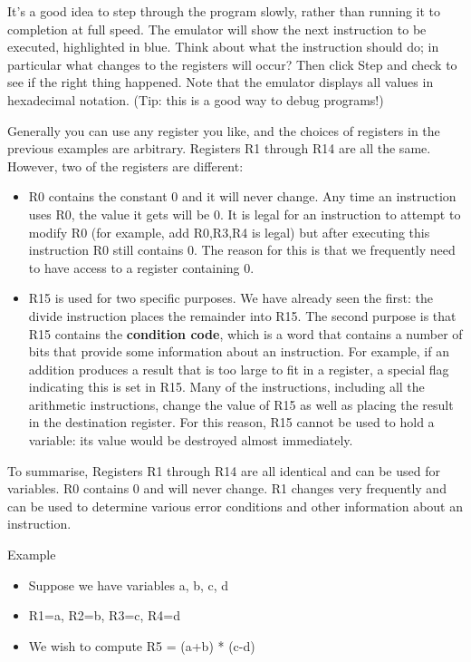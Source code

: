 \documentclass[11pt]{article}
\begin{document}
\begin{itemize}
It's a good idea to step through the program slowly, rather than
running it to completion at full speed.  The emulator will show the
next instruction to be executed, highlighted in blue.  Think about
what the instruction should do; in particular what changes to the
registers will occur?  Then click Step and check to see if the right
thing happened.  Note that the emulator displays all values in
hexadecimal notation.  (Tip: this is a good way to debug programs!)

Generally you can use any register you like, and the choices of
registers in the previous examples are arbitrary.  Registers R1
through R14 are all the same.  However, two of the registers are
different:

\begin{itemize}
\item R0 contains the constant 0 and it will never change.  Any time an
instruction uses R0, the value it gets will be 0.  It is legal for
an instruction to attempt to modify R0 (for example, add R0,R3,R4 is
legal) but after executing this instruction R0 still contains 0.
The reason for this is that we frequently need to have access to a
register containing 0.

\item R15 is used for two specific purposes.  We have already seen the
first: the divide instruction places the remainder into R15.  The
second purpose is that R15 contains the \textbf{condition code}, which is a
word that contains a number of bits that provide some information
about an instruction.  For example, if an addition produces a result
that is too large to fit in a register, a special flag indicating
this is set in R15.  Many of the instructions, including all the
arithmetic instructions, change the value of R15 as well as placing
the result in the destination register.  For this reason, R15 cannot
be used to hold a variable: its value would be destroyed almost
immediately.
\end{itemize}

To summarise, Registers R1 through R14 are all identical and can be
used for variables.  R0 contains 0 and will never change.  R1 changes
very frequently and can be used to determine various error conditions
and other information about an instruction.

Example

\begin{itemize}
\item Suppose we have variables a, b, c, d
\item R1=a, R2=b, R3=c, R4=d
\item We wish to compute R5 = (a+b) * (c-d)
\end{itemize}


\end{itemize}
\end{document}
